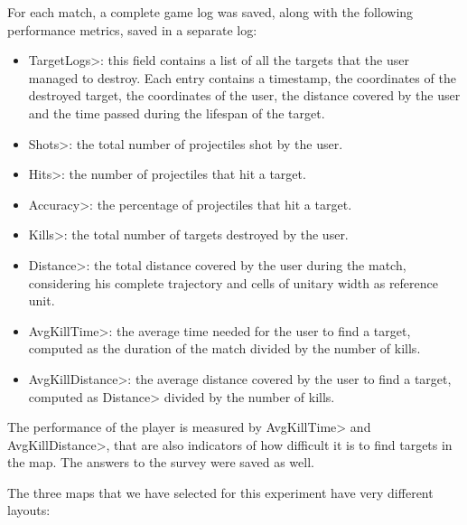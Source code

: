 For each match, a complete game log was saved, along with the following performance metrics, saved in a separate log:
\begin{itemize}
\item \<TargetLogs>: this field contains a list of all the targets that the user managed to destroy. Each entry contains a timestamp, the coordinates of the destroyed target, the coordinates of the user, the distance covered by the user and the time passed during the lifespan of the target.
\item \<Shots>: the total number of projectiles shot by the user.
\item \<Hits>: the number of projectiles that hit a target.
\item \<Accuracy>: the percentage of projectiles that hit a target.
\item \<Kills>: the total number of targets destroyed by the user.
\item \<Distance>: the total distance covered by the user during the match, considering his complete trajectory and cells of unitary width as reference unit.
\item \<AvgKillTime>: the average time needed for the user to find a target, computed as the duration of the match divided by the number of kills.
\item \<AvgKillDistance>: the average distance covered by the user to find a target, computed as \<Distance> divided by the number of kills.
\end{itemize}

\noindent
The performance of the player is measured by \<AvgKillTime> and \<AvgKillDistance>, that are also indicators of how difficult it is to find targets in the map. The answers to the survey were saved as well.

\par

The three maps that we have selected for this experiment have very different layouts:

